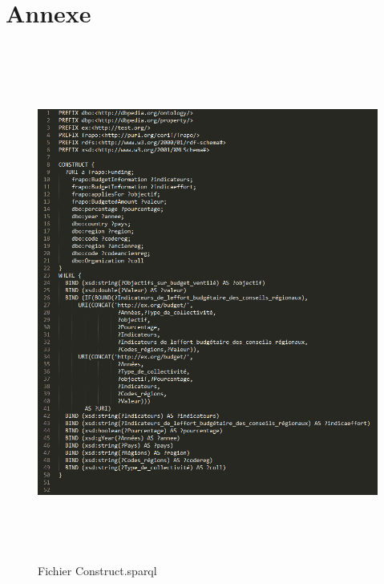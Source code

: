 \documentclass[a4paper,sffamily,12pt]{article}
\begin{document}
		\newpage			
		
	\section{Annexe}

		\vspace{0.5cm}
		
		\begin{figure}[!h]
				
			\centerline{\includegraphics[height=17cm]{picture/constructv1.png}}
			\caption{Fichier Construct.sparql}
			\label{constructv1}
			
		\end{figure}		
	
		\newpage
\end{document}
